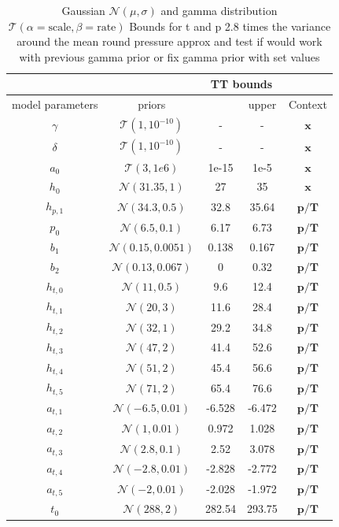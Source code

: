 \begin{table}
	\centering
	\begin{tabular}{ |c||c|c|c|c|   }
		\hline
		& &\multicolumn{2}{|c|}{TT bounds}&\\
		\hline
		model parameters& priors&\makecell{lower}& \makecell{upper\\
		}&Context\\
		\hline
		
		$\gamma$ & $\mathcal{T}(1,10^{-10})$ &- &-& $\bm{x}$\\ \hhline{|=||=|=|=|=|}
		$\delta$ &$\mathcal{T}(1,10^{-10})$ & -&-& $\bm{x}$\\ \hline
		$a_0$ &  $\mathcal{T}(3,1e6)$& 1e-15&1e-5&$\bm{x}$\\ \hline
		$h_0$ &  $\mathcal{N}(31.35,1)$&27 &35&$\bm{x}$\\ \hline
		$h_{p,1}$ &  $\mathcal{N}(34.3,0.5)$& 32.8&35.64&$\bm{p/T}$\\ \hline
		$p_0$ &  $\mathcal{N}(6.5,0.1)$&6.17 &6.73&$\bm{p/T}$\\ \hline
		$b_1$ &  $\mathcal{N}(0.15,0.0051)$& 0.138  &0.167&$\bm{p/T}$\\ \hline
		$b_2$ & $\mathcal{N}(0.13,0.067)$& 0&0.32&$\bm{p/T}$\\ \hline
		$h_{t,0}$ &  $\mathcal{N}(11,0.5)$&9.6 &12.4&$\bm{p/T}$\\ \hline
		$h_{t,1}$ &  $\mathcal{N}(20,3)$&11.6 &28.4&$\bm{p/T}$\\ \hline
		$h_{t,2}$ &  $\mathcal{N}(32,1)$&29.2 &34.8&$\bm{p/T}$\\ \hline
		$h_{t,3}$ &  $\mathcal{N}(47,2)$&41.4 &52.6&$\bm{p/T}$\\ \hline
		$h_{t,4}$ &  $\mathcal{N}(51,2)$&45.4 &56.6&$\bm{p/T}$\\ \hline
		$h_{t,5}$ &  $\mathcal{N}(71,2)$&65.4 &76.6&$\bm{p/T}$\\ \hline
		$a_{t,1}$ &  $\mathcal{N}(-6.5,0.01)$&-6.528 &-6.472&$\bm{p/T}$\\ \hline
		$a_{t,2}$ &  $\mathcal{N}(1,0.01)$&0.972 &1.028&$\bm{p/T}$\\ \hline
		$a_{t,3}$ &  $\mathcal{N}(2.8,0.1)$&2.52 &3.078&$\bm{p/T}$\\ \hline
		$a_{t,4}$ &  $\mathcal{N}(-2.8,0.01)$&-2.828 &-2.772&$\bm{p/T}$\\ \hline
		$a_{t,5}$ & $\mathcal{N}(-2,0.01)$ &-2.028 &-1.972&$\bm{p/T}$\\ \hline
		$t_{0}$ &  $\mathcal{N}(288,2)$& 282.54 &293.75&$\bm{p/T}$\\
		\hline
	\end{tabular}
	\caption{Gaussian $\mathcal{N}(\mu,\sigma)$ and gamma distribution $\mathcal{T}(\alpha = \text{scale}, \beta = \text{rate})$
		Bounds for t and p 2.8 times the variance around the mean
		round pressure approx and  test if would work with previous gamma prior or fix gamma prior with set values}
	\label{tab:1}
\end{table}

